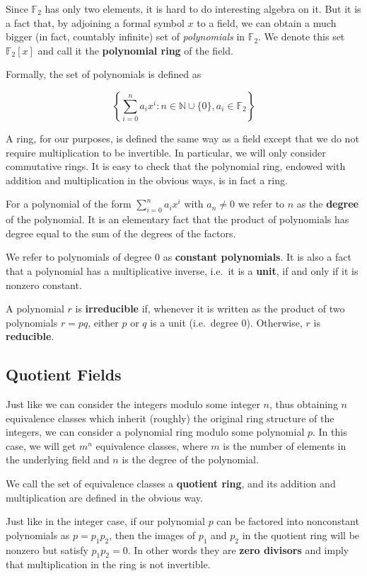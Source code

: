 \documentclass[letterpaper]{article}
\newcommand{\ftwo}{\mathbb{F}_2}
\begin{document}
Since $\ftwo$ has only two elements, it is hard to do interesting algebra on
it. But it is a fact that, by adjoining a formal symbol $x$ to a field, we
can obtain a much bigger (in fact, countably infinite) set of \emph{polynomials}
in $\ftwo$. We denote this set $\ftwo[x]$ and call it the \textbf{polynomial
ring} of the field.

Formally, the set of polynomials is defined as

\[ \left\{ \sum_{i=0}^n a_{i}x^i : n\in\mathbb{N}\cup\{0\}, a_i\in \ftwo  \right\} \]

A ring, for our purposes, is defined the same way as a field except that we do
not require multiplication to be invertible. In particular, we will only consider
commutative rings. It is easy to check that the
polynomial ring, endowed with addition and multiplication in the obvious ways,
is in fact a ring.

For a polynomial of the form $\sum_{i=0}^n a_{i}x^i$ with $a_n\neq0$ we refer to $n$ as the
\textbf{degree} of the polynomial. It is an elementary fact that the product
of polynomials has degree equal to the sum of the degrees of the factors.

We refer to polynomials of degree 0 as \textbf{constant polynomials}. It is
also a fact that a polynomial has a multiplicative inverse, i.e.~it is a
\textbf{unit}, if and only if it is nonzero constant.

A polynomial $r$ is \textbf{irreducible} if, whenever it is written as the product
of two polynomials $r=pq$, either $p$ or $q$ is a unit (i.e.~degree 0). Otherwise,
$r$ is \textbf{reducible}.

\subsection{Quotient Fields}

Just like we can consider the integers modulo some integer $n$, thus obtaining
$n$ equivalence classes which inherit (roughly) the original ring structure of
the integers, we can consider a polynomial ring modulo some polynomial $p$. In
this case, we will get $m^n$ equivalence classes, where $m$ is the number of
elements in the underlying field and $n$ is the degree of the polynomial.

We call the set of equivalence classes a \textbf{quotient ring}, and its addition
and multiplication are defined in the obvious way.

Just like in the integer case, if our polynomial $p$ can be factored into
nonconstant polynomials as $p=p_1p_2$, then the images of $p_1$ and $p_2$ in the quotient ring will
be nonzero but satisfy $p_1p_2 = 0$. In other words they are \textbf{zero
divisors} and imply that multiplication in the ring is not invertible.
\end{document}
